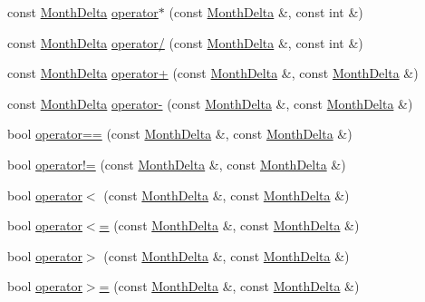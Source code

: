 \begin{DoxyCompactItemize}
\item 
const \hyperlink{structMonthDelta}{\-Month\-Delta} \hyperlink{structMonthDelta_a766914d0071f3b05bb8207fb43ed8a7f}{operator$\ast$} (const \hyperlink{structMonthDelta}{\-Month\-Delta} \&, const int \&)
\item 
const \hyperlink{structMonthDelta}{\-Month\-Delta} \hyperlink{structMonthDelta_a1dda088a057b9b834a81182b177811a3}{operator/} (const \hyperlink{structMonthDelta}{\-Month\-Delta} \&, const int \&)
\item 
const \hyperlink{structMonthDelta}{\-Month\-Delta} \hyperlink{structMonthDelta_adf6400ab47cfda30bcf0e52c489dcd65}{operator+} (const \hyperlink{structMonthDelta}{\-Month\-Delta} \&, const \hyperlink{structMonthDelta}{\-Month\-Delta} \&)
\item 
const \hyperlink{structMonthDelta}{\-Month\-Delta} \hyperlink{structMonthDelta_a22a21f373298f477cfd559740b9e5e4d}{operator-\/} (const \hyperlink{structMonthDelta}{\-Month\-Delta} \&, const \hyperlink{structMonthDelta}{\-Month\-Delta} \&)
\item 
bool \hyperlink{structMonthDelta_aa0803460a688c23c8e65d9fa9b543001}{operator==} (const \hyperlink{structMonthDelta}{\-Month\-Delta} \&, const \hyperlink{structMonthDelta}{\-Month\-Delta} \&)
\item 
bool \hyperlink{structMonthDelta_a18026b840e36147e3568f3a4a054e047}{operator!=} (const \hyperlink{structMonthDelta}{\-Month\-Delta} \&, const \hyperlink{structMonthDelta}{\-Month\-Delta} \&)
\item 
bool \hyperlink{structMonthDelta_a67951bca9aab80b5d53a38d6332ff38a}{operator$<$} (const \hyperlink{structMonthDelta}{\-Month\-Delta} \&, const \hyperlink{structMonthDelta}{\-Month\-Delta} \&)
\item 
bool \hyperlink{structMonthDelta_a56be34fa0a6a432cebfacc21acecaf88}{operator$<$=} (const \hyperlink{structMonthDelta}{\-Month\-Delta} \&, const \hyperlink{structMonthDelta}{\-Month\-Delta} \&)
\item 
bool \hyperlink{structMonthDelta_a583a0205709b2d14afb855f8656c783c}{operator$>$} (const \hyperlink{structMonthDelta}{\-Month\-Delta} \&, const \hyperlink{structMonthDelta}{\-Month\-Delta} \&)
\item 
bool \hyperlink{structMonthDelta_a6ffa4372b018021cc399ff18b0e26774}{operator$>$=} (const \hyperlink{structMonthDelta}{\-Month\-Delta} \&, const \hyperlink{structMonthDelta}{\-Month\-Delta} \&)
\end{DoxyCompactItemize}


